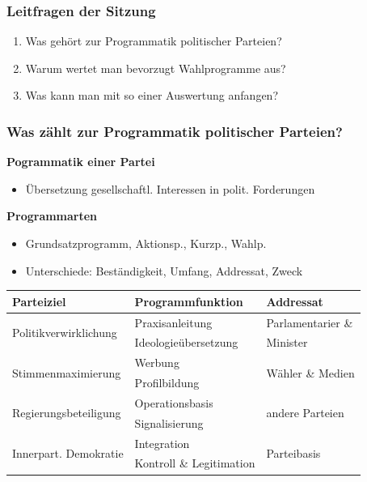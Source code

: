 \documentclass{beamer}
\begin{document}
\maketitle

\begin{frame}
    \frametitle{Leitfragen der Sitzung}
    \begin{enumerate}
        \item Was gehört zur Programmatik politischer Parteien?
        \item Warum wertet man bevorzugt Wahlprogramme aus?
        \item Was kann man mit so einer Auswertung anfangen?
    \end{enumerate}
\end{frame}

\begin{frame}
    \frametitle{Was zählt zur Programmatik politischer Parteien?}
    \textbf{Pogrammatik einer Partei}
    \begin{itemize}
        \item Übersetzung gesellschaftl. Interessen in polit. Forderungen
    \end{itemize}

    \textbf{Programmarten}
    \begin{itemize}
        \item Grundsatzprogramm, Aktionsp., Kurzp., Wahlp.
        \item Unterschiede: Beständigkeit, Umfang, Addressat, Zweck
    \end{itemize}

    \begin{center}
        \footnotesize
        \begin{tabular}{*{3}{l}}
            \toprule
            \textbf{Parteiziel} & \textbf{Programmfunktion} & \textbf{Addressat} \\
            \midrule
            \multirow{2}{*}{Politikverwirklichung} & Praxisanleitung & Parlamentarier \& \\
            & Ideologieübersetzung & Minister \\
            \multirow{2}{*}{Stimmenmaximierung} & Werbung & \multirow{2}{*}{Wähler \& Medien} \\
            & Profilbildung & \\
            \multirow{2}{*}{Regierungsbeteiligung} & Operationsbasis & \multirow{2}{*}{andere Parteien} \\
            & Signalisierung & \\
            \multirow{2}{*}{Innerpart. Demokratie} & Integration & \multirow{2}{*}{Parteibasis} \\
            & Kontroll \& Legitimation & \\
            \bottomrule
        \end{tabular}
    \end{center}
\end{frame}
\end{document}
